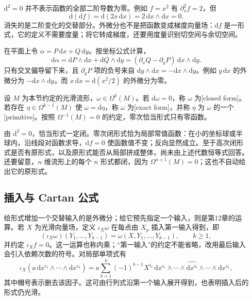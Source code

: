 \(\mathrm{d}^2=0\) 并不表示函数的全部二阶导数为零。例如 \(f=x^2\) 有 \(\partial_x^2f=2\)，但
\[
	\mathrm{d}(\mathrm{d}f)=\mathrm{d}(2x\,\mathrm{d}x)=2\,\mathrm{d}x\wedge\mathrm{d}x=0.
\]
消失的是二阶变化的交替部分。外微分也不是把函数变成梯度向量场：\(\mathrm{d}f\) 是一形式，它的定义不需要度量；将它转成梯度，还要用度量识别切空间与余切空间。

\begin{example}
	在平面上令 \(\alpha=P\,\mathrm{d}x+Q\,\mathrm{d}y\)。按坐标公式计算，
	\[
		\mathrm{d}\alpha
		=\mathrm{d}P\wedge\mathrm{d}x+\mathrm{d}Q\wedge\mathrm{d}y
		=(\partial_xQ-\partial_yP)\,\mathrm{d}x\wedge\mathrm{d}y.
	\]
	只有交叉偏导留下来，且 \(\partial_yP\) 项的负号来自 \(\mathrm{d}y\wedge\mathrm{d}x=-\mathrm{d}x\wedge\mathrm{d}y\)。例如 \(y\,\mathrm{d}x\) 的外微分为 \(-\mathrm{d}x\wedge\mathrm{d}y\)，而 \(x\,\mathrm{d}x=\mathrm{d}(x^2/2)\) 的外微分为零。
\end{example}

\begin{definition}\label{g1:def:closed-exact-form}
	设 \(M\) 为本节约定的光滑流形，\(\omega\in\Omega^k(M)\)。若 \(\mathrm{d}\omega=0\)，称 \(\omega\) 为[closed form]。若存在 \(\eta\in\Omega^{k-1}(M)\) 使 \(\omega=\mathrm{d}\eta\)，称 \(\omega\) 为[exact form]，并称 \(\eta\) 为 \(\omega\) 的一个[primitive]。按照 \(\Omega^{-1}(M)=0\) 的约定，零次恰当形式只有零函数。
\end{definition}

由 \(\mathrm{d}^2=0\)，恰当形式一定闭。零次闭形式恰为局部常值函数：在小的坐标球或半球内，沿线段对函数求导，\(\mathrm{d}f=0\) 使函数值不变；反向显然成立。至于高次闭形式是否有原形式，以及原形式能否从局部拼成整体，尚未由上述代数恒等式回答。还要留意，\(n\) 维流形上的每个 \(n\) 形式都闭，因为 \(\Omega^{n+1}(M)=0\)；这也不自动给出它的原形式。

\subsection{插入与 Cartan 公式}
\label{g1:subsec:1401:03}

给形式增加一个交替输入的是外微分；给它预先指定一个输入，则是第12章的运算。若 \(X\) 为光滑向量场，定义 \(\iota_X\omega\) 在每点由 \(X_p\) 插入第一输入得到，即
\[
	(\iota_X\omega)(Y_1,\ldots,Y_{k-1})=\omega(X,Y_1,\ldots,Y_{k-1}),\qquad k\geq1,
\]
并约定 \(\iota_Xf=0\)。这一运算也称内乘；“第一输入”的约定不能省略，改用最后输入会引入依赖次数的符号。对局部单项式有
\[
	\iota_X(a\,\mathrm{d}x^{i_1}\wedge\cdots\wedge\mathrm{d}x^{i_k})
	=a\sum_{b=1}^k(-1)^{b-1}X^{i_b}\,\mathrm{d}x^{i_1}\wedge\cdots\wedge\widehat{\mathrm{d}x^{i_b}}\wedge\cdots\wedge\mathrm{d}x^{i_k},
\]
其中帽号表示删去该因子。这可由行列式沿第一个输入展开得到，也表明插入后的形式仍光滑。

